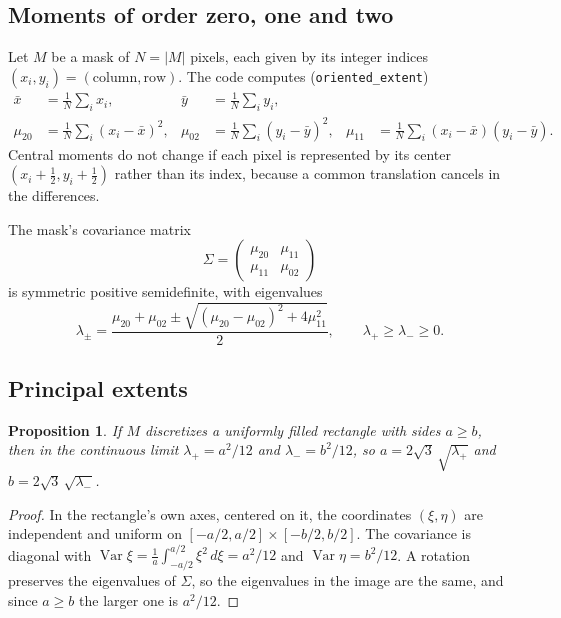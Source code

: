\documentclass[11pt,a4paper]{article}
\newtheorem{proposition}{Proposition}
\theoremstyle{definition}
\theoremstyle{remark}
\newcommand{\code}[1]{\texttt{#1}}
\begin{document}
\subsection{Moments of order zero, one and two}

Let $M$ be a mask of $N = |M|$ pixels, each given by its integer indices
$(x_i, y_i) = (\text{column}, \text{row})$. The code computes
(\code{oriented\_extent})
\begin{align}
\bar x &= \frac1N\sum_i x_i, & \bar y &= \frac1N\sum_i y_i, \\
\mu_{20} &= \frac1N\sum_i (x_i-\bar x)^2, &
\mu_{02} &= \frac1N\sum_i (y_i-\bar y)^2, &
\mu_{11} &= \frac1N\sum_i (x_i-\bar x)(y_i-\bar y).
\end{align}
Central moments do not change if each pixel is represented by its center
$(x_i+\tfrac12, y_i+\tfrac12)$ rather than its index, because a common
translation cancels in the differences.

The mask's covariance matrix
\begin{equation}
\Sigma = \begin{pmatrix}\mu_{20} & \mu_{11}\\ \mu_{11} & \mu_{02}\end{pmatrix}
\end{equation}
is symmetric positive semidefinite, with eigenvalues
\begin{equation}
\label{eq:eigenvalues}
\lambda_\pm = \frac{\mu_{20}+\mu_{02} \pm \sqrt{(\mu_{20}-\mu_{02})^2 + 4\mu_{11}^2}}{2},
\qquad \lambda_+ \ge \lambda_- \ge 0 .
\end{equation}

\subsection{Principal extents}

\begin{proposition}
\label{prop:rectangle}
If $M$ discretizes a uniformly filled rectangle with sides $a\ge b$, then in the
continuous limit $\lambda_+ = a^2/12$ and $\lambda_- = b^2/12$, so
$a = 2\sqrt3\,\sqrt{\lambda_+}$ and $b = 2\sqrt3\,\sqrt{\lambda_-}$.
\end{proposition}
\begin{proof}
In the rectangle's own axes, centered on it, the coordinates $(\xi,\eta)$ are
independent and uniform on $[-a/2,a/2]\times[-b/2,b/2]$. The covariance is
diagonal with $\operatorname{Var}\xi = \frac1a\int_{-a/2}^{a/2}\xi^2\,d\xi =
a^2/12$ and $\operatorname{Var}\eta = b^2/12$. A rotation preserves the
eigenvalues of $\Sigma$, so the eigenvalues in the image are the same, and since
$a\ge b$ the larger one is $a^2/12$.
\end{proof}
\end{document}
